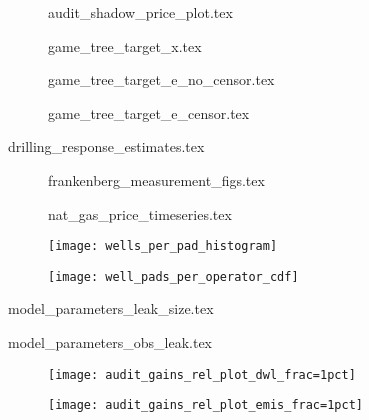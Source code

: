 \documentclass[12pt,oneside,letterpaper]{article}
\begin{document}
\begin{figure}[H]
{audit_shadow_price_plot.tex}
\end{figure}

\begin{figure}[H]
{game_tree_target_x.tex}
\end{figure}

\begin{figure}[H]
{game_tree_target_e_no_censor.tex}
\end{figure}

\begin{figure}[H]
{game_tree_target_e_censor.tex}
\end{figure}

\begin{table}[H]
{drilling_response_estimates.tex}
\end{table}

\begin{figure}[H]
{frankenberg_measurement_figs.tex}
\end{figure}

\begin{figure}[H] %
{nat_gas_price_timeseries.tex}
\end{figure}

\begin{figure}[H]
\label{fig:wells-per-pad}
\texttt{[image: wells\_per\_pad\_histogram]}
\end{figure}

\begin{figure}[H]
\label{fig:well-pads-per-operator}
\texttt{[image: well\_pads\_per\_operator\_cdf]}
\end{figure}

\begin{table}[H]
{model_parameters_leak_size.tex}
\end{table}

\begin{table}[H]
{model_parameters_obs_leak.tex}
\end{table}

\begin{figure}[H]
\label{fig:audit-gains-dwl-rel-plot}
\texttt{[image: audit\_gains\_rel\_plot\_dwl\_frac=1pct]}
\end{figure}

\begin{figure}[H]
\label{fig:audit-gains-emis-rel-plot}
\texttt{[image: audit\_gains\_rel\_plot\_emis\_frac=1pct]}
\end{figure}
\end{document}
